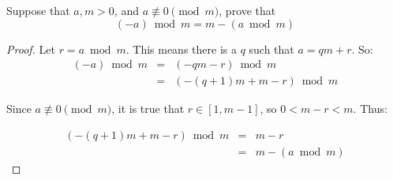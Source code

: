 \begin{statement}{1.2}
  Suppose that $a,m>0$, and $a \not\equiv 0\pmod m$, prove that
  \begin{equation*}
    (-a) \bmod m = m - (a \bmod m)
  \end{equation*}
\end{statement}
\begin{proof}

  Let $r = a \bmod m$. This means there is a $q$ such that $a = qm + r$. So:
  \begin{eqnarray*}
    (-a) \bmod m &=& (-qm - r) \bmod m \\
    &=& (-(q+1)m + m - r ) \bmod m
  \end{eqnarray*}

  Since $a \not\equiv 0 \pmod m$, it is true that $r \in [1,m-1]$, so $0 < m - r < m$. Thus:

    \begin{eqnarray*}
      (-(q+1)m + m - r ) \bmod m &=&  m - r \\
      &=& m - (a \bmod m)
    \end{eqnarray*}

  
\end{proof}
